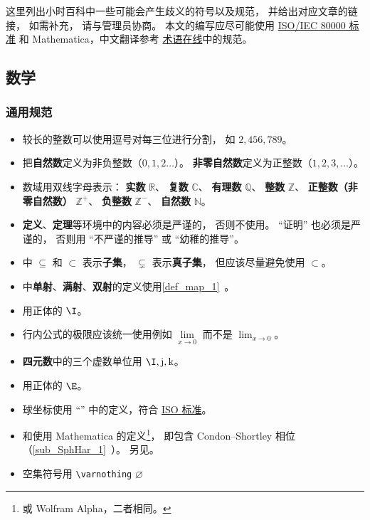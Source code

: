 
这里列出小时百科中一些可能会产生歧义的符号以及规范， 并给出对应文章的链接， 如需补充， 请与管理员协商。 本文的编写应尽可能使用 \href{https://en.wikipedia.org/wiki/ISO/IEC_80000}{ISO/IEC 80000 标准} 和 Mathematica，中文翻译参考 \href{https://www.termonline.cn/about}{术语在线}中的规范。

\subsection{数学}
\subsubsection{通用规范}
\begin{itemize}
\item 较长的整数可以使用逗号对每三位进行分割， 如 $2,456,789$。
\item 把\textbf{自然数}定义为非负整数（$0,1,2\dots$）。 \textbf{非零自然数}定义为正整数（$1,2,3,\dots$）。
\item 数域用双线字母表示： \textbf{实数} $\mathbb R$、 \textbf{复数} $\mathbb C$、 \textbf{有理数} $\mathbb Q$、 \textbf{整数} $\mathbb Z$、 \textbf{正整数（非零自然数）} $\mathbb Z^+$、 \textbf{负整数} $\mathbb Z^-$、 \textbf{自然数} $\mathbb N$。%
\item \textbf{定义}、\textbf{定理}等环境中的内容必须是严谨的， 否则不使用。 “证明” 也必须是严谨的， 否则用 “不严谨的推导” 或 “幼稚的推导”。
\item {}中 $\subseteq$ 和 $\subset$ 表示\textbf{子集}， $\subsetneq$ 表示\textbf{真子集}， 但应该尽量避免使用 $\subset$。
\item {}中\textbf{单射}、\textbf{满射}、\textbf{双射}的定义使用\autoref{def_map_1}~。
\item {} 用正体的 $\I$。
\item 行内公式的极限应该统一使用例如 $\lim\limits_{x\to 0}$ 而不是 $\lim_{x\to 0}$。 
\item \textbf{四元数}中的三个虚数单位用 $\I, \mathrm{j}, \mathrm{k}$。
\item {} 用正体的 $\E$。
\item 球坐标使用 “” 中的定义，符合 \href{https://www.iso.org/standard/64973.html}{ISO 标准}。
\item {}和使用 Mathematica 的定义\footnote{或 Wolfram Alpha，二者相同。}， 即包含 Condon–Shortley 相位（\autoref{sub_SphHar_1}~）。 另见。
\item 空集符号用 \verb|\varnothing| $\varnothing$
\end{itemize}

